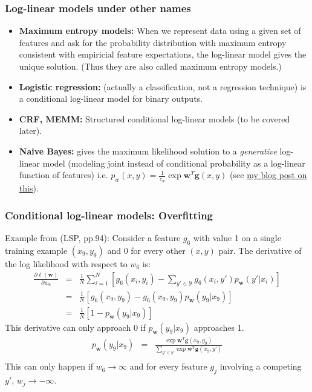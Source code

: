 \documentclass[ignorenonframetext,plain]{beamer}
\begin{document}
\begin{frame}\frametitle{Log-linear models under other names}
\begin{itemize}
\item \textbf{Maximum entropy models:} When we represent data using a
  given set of features and ask for the probability distribution with
  maximum entropy consistent with empiricial feature expectations, the
  log-linear model gives the unique solution.  (Thus they are also
  called maximum entropy models.)
\item \textbf{Logistic regression:} (actually a classification, not a
  regression technique) is a conditional log-linear model for binary
  outputs.
\item \textbf{CRF, MEMM:} Structured conditional log-linear models (to
  be covered later).
\item \textbf{Naive Bayes:} gives the maximum likelihood solution to a
  {\em generative} log-linear model (modeling joint instead of
  conditional probability as a log-linear function of features)
  i.e. $p_w(x,y) = \frac{1}{z_w}\exp \mathbf{w}^T \mathbf{g}(x, y)$
  (see
  \href{http://www.denizyuret.com/2010/11/naive-bayes-is-joint-maximum-entropy.html}{my
    blog post on this}).
\end{itemize}
\end{frame}

\begin{frame}\frametitle{Conditional log-linear models: Overfitting}
Example from (LSP, pp.94): Consider a feature $g_6$ with value 1 on a
single training example $(x_9, y_9)$ and 0 for every other $(x, y)$
pair.  The derivative of the log likelihood with respect to $w_6$
is: \begin{eqnarray*} \frac{\partial \ell(\mathbf{w})}{\partial w_6}
  &=& \frac{1}{N} \sum_{i=1}^N \left[ g_6(x_i, y_i) -
    \sum_{y'\in\mathcal{Y}} g_6(x_i, y') p_\mathbf{w}(y'|x_i) \right]
  \\ &=& \frac{1}{N} \left[g_6(x_9, y_9) - g_6(x_9, y_9)
    p_\mathbf{w}(y_9|x_9)\right] \\ &=& \frac{1}{N} \left[ 1 -
    p_\mathbf{w}(y_9|x_9) \right]
\end{eqnarray*}
This derivative can only approach 0 if $p_\mathbf{w}(y_9|x_9)$
approaches 1.\begin{eqnarray*}
p_\mathbf{w}(y_9|x_9) &=& \frac{\exp \mathbf{w}^T \mathbf{g}(x_9,y_9)}
{\sum_{y'\in\mathcal{Y}} \exp \mathbf{w}^T \mathbf{g}(x_9,y')} \\
\end{eqnarray*}
This can only happen if $w_6\rightarrow\infty$ and for every feature
$g_j$ involving a competing $y'$, $w_j\rightarrow-\infty$.
\end{frame}
\end{document}
